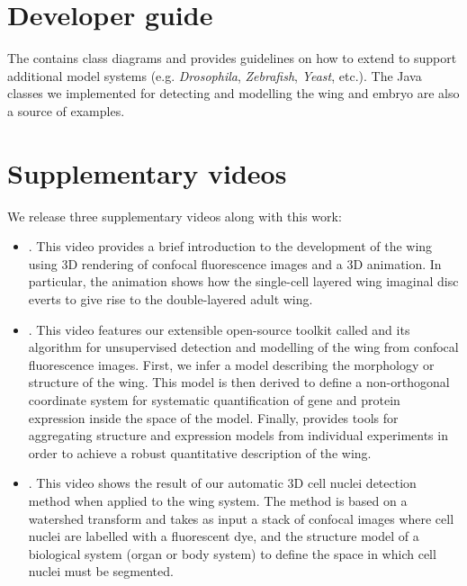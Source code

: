 
\section{Developer guide}
The \wingjDeveloperGuide contains class diagrams and provides guidelines on how to extend \wingj to support additional model systems (e.g. \textit{Drosophila}, \textit{Zebrafish}, \textit{Yeast}, etc.). The Java classes we implemented for detecting and modelling the \droso wing and embryo are also a source of examples.

\section{Supplementary videos}
We release three supplementary videos along with this work:


\begin{itemize}
 \item \wingjVideoSOne. This video provides a brief introduction to the development of the \droso wing using 3D rendering of confocal fluorescence images and a 3D animation. In particular, the animation shows how the single-cell layered wing imaginal disc everts to give rise to the double-layered adult wing.
 \item \wingjVideoSTwo. This video features our extensible open-source toolkit called \wingj and its algorithm for unsupervised detection and modelling of the \droso wing from confocal fluorescence images. First, we infer a model describing the morphology or structure of the wing. This model is then derived to define a non-orthogonal coordinate system for systematic quantification of gene and protein expression inside the space of the model. Finally, \wingj provides tools for aggregating structure and expression models from individual experiments in order to achieve a robust quantitative description of the \droso wing.
 \item \wingjVideoSThree. This video shows the result of our automatic 3D cell nuclei detection method when applied to the \droso wing system. The method is based on a watershed transform and takes as input a stack of confocal images where cell nuclei are labelled with a fluorescent dye, and the structure model of a biological system (organ or body system) to define the space in which cell nuclei must be segmented.
\end{itemize}

